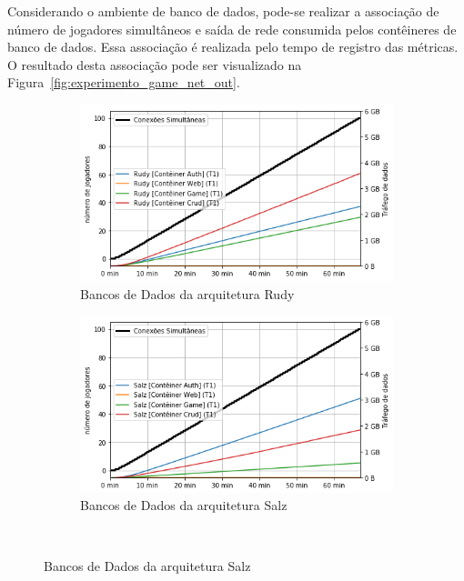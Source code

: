 Considerando o ambiente de banco de dados, pode-se realizar a associação de número de jogadores simultâneos e saída de rede consumida pelos contêineres de banco de dados.
%
Essa associação é realizada pelo tempo de registro das métricas.
%
O resultado desta associação pode ser visualizado na Figura~\ref{fig:experimento_game_net_out}.

\begin{figure}[htb!]
    \caption{Saída de dados da rede dos microsserviços}
    \label{fig:experimento_game_net_out}

    \begin{subfigure}{0.5\textwidth}
        \centering
        \includegraphics[width=.95\linewidth]{figuras/analise/rt/r_net_out_arch.png}
        \caption{Bancos de Dados da arquitetura Rudy}
        \label{fig:r_netout_arch}
    \end{subfigure}%
    \begin{subfigure}{0.5\textwidth}
        \centering
        \includegraphics[width=.95\linewidth]{figuras/analise/rt/s_net_out_arch.png}
        \caption{Bancos de Dados da arquitetura Salz}
        \label{fig:s_netout_arch}
    \end{subfigure}\\


\end{figure}
